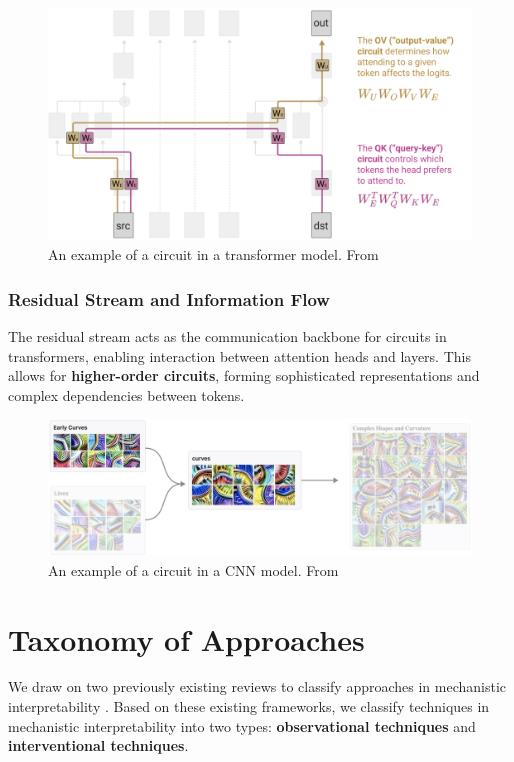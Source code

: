 \documentclass[sigconf,authoryear]{acmart}
\begin{document}
\begin{figure}
  \centering
  \includegraphics[width=0.9\columnwidth]{transformer_circuit_example.png}
  \caption{An example of a circuit in a transformer model. From \citep{olah2020zoom}} 
  \label{fig:figurelabel}
\end{figure}

\subsubsection{Residual Stream and Information Flow}
The residual stream acts as the communication backbone for circuits in transformers, enabling interaction between attention heads and layers. This allows for \textbf{higher-order circuits}, forming sophisticated representations and complex dependencies between tokens.

\begin{figure}
  \centering
  \includegraphics[width=0.9\columnwidth]{circuit_example.png}
  \caption{An example of a circuit in a CNN model. From \citep{olah2020zoom}} 
  \label{fig:figurelabel}
\end{figure}


\section{Taxonomy of Approaches}
We draw on two previously existing reviews to classify approaches in mechanistic interpretability \citep{bereska_mechanistic_2024, rai2024practicalreviewmechanisticinterpretability}. Based on these existing frameworks, we classify techniques in mechanistic interpretability into two types: \textbf{observational techniques} and \textbf{interventional techniques}. 
\end{document}
